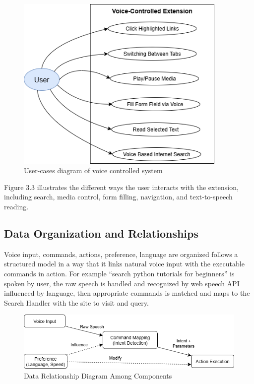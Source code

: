 \begin{figure}[H]
   \centering
   \includegraphics[width=4in]{latex/Chap3/User-Cases-Diagram.png}
   \caption{User-cases diagram of voice controlled system}
   \label{fig:usr-cases-diagram}
\end{figure}

Figure 3.3 illustrates the different ways the user interacts with the extension, including search, media control, form filling, navigation, and text-to-speech reading.

\subsection{Data Organization and Relationships}
Voice input, commands, actions, preference, language are organized follows a structured model in a way that it links natural voice input with the executable commands in action. For example “search python tutorials for beginners” is spoken by user, the raw speech is handled and recognized by web speech API influenced by language, then appropriate commands is matched and maps to the Search Handler with the site to visit and query.

 \begin{figure}[H] 
   \centering
   \includegraphics[width=6in]{latex/Chap3/Data-relationship.png}
   \caption{Data Relationship Diagram Among Components}
   \label{fig:model}
\end{figure}


